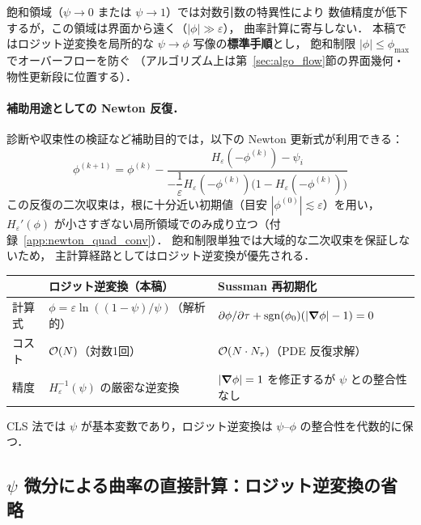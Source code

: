 飽和領域（$\psi \to 0$ または $\psi \to 1$）では対数引数の特異性により
数値精度が低下するが，この領域は界面から遠く（$|\phi| \gg \varepsilon$），
曲率計算に寄与しない．
本稿ではロジット逆変換を局所的な $\psi\to\phi$ 写像の\textbf{標準手順}とし，
飽和制限 $|\phi| \le \phi_{\max}$ でオーバーフローを防ぐ
（アルゴリズム上は第~\ref{sec:algo_flow}節の界面幾何・物性更新段に位置する）．

\paragraph{補助用途としての Newton 反復．}
診断や収束性の検証など補助目的では，以下の Newton 更新式が利用できる：
\begin{equation}
  \phi^{(k+1)} = \phi^{(k)} - \frac{H_\varepsilon(-\phi^{(k)}) - \psi_i}{-\dfrac{1}{\varepsilon}H_\varepsilon(-\phi^{(k)})\bigl(1-H_\varepsilon(-\phi^{(k)})\bigr)}
  \label{eq:newton_inversion}
\end{equation}
この反復の二次収束は，根に十分近い初期値（目安 $|\phi^{(0)}|\lesssim \varepsilon$）を用い，
$H_\varepsilon'(\phi)$ が小さすぎない局所領域でのみ成り立つ（付録~\ref{app:newton_quad_conv}）．
飽和制限単独では大域的な二次収束を保証しないため，
主計算経路としてはロジット逆変換が優先される．

\begin{tcolorbox}[mybox, title={ロジット逆変換 vs. Sussman 再初期化}]
\begin{center}
\renewcommand{\arraystretch}{\PaperTableArrayStretch}
\begin{tabular}{lll}
\hline
 & \textbf{ロジット逆変換（本稿）} & \textbf{Sussman 再初期化} \\
\hline
計算式 & $\phi = \varepsilon\ln((1-\psi)/\psi)$（解析的） & $\partial\phi/\partial\tau + \mathrm{sgn}(\phi_0)(|\bm{\nabla}\phi|-1)=0$ \\
コスト & $\mathcal{O}(N)$（対数1回） & $\mathcal{O}(N \cdot N_\tau)$（PDE 反復求解） \\
精度 & $H_\varepsilon^{-1}(\psi)$ の厳密な逆変換 & $|\bm{\nabla}\phi|=1$ を修正するが $\psi$ との整合性なし \\
\hline
\end{tabular}
\end{center}
CLS 法では $\psi$ が基本変数であり，ロジット逆変換は $\psi$--$\phi$ の整合性を代数的に保つ．
\end{tcolorbox}

\subsection{\texorpdfstring{$\psi$}{ψ} 微分による曲率の直接計算：ロジット逆変換の省略}
\label{sec:curvature_direct_psi_cls}

